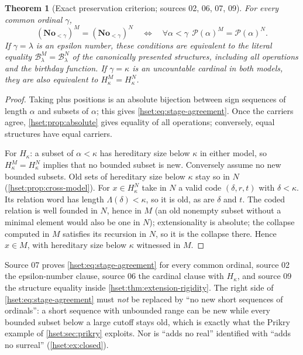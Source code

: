 \documentclass[11pt,letterpaper]{article}
\newtheorem{theorem}{Theorem}[section]
\theoremstyle{definition}
\theoremstyle{remark}
\newcommand{\No}{\mathbf{No}}
\newcommand{\B}{\mathcal B}
\newcommand{\Pow}{\mathcal P}
\begin{document}
\begin{theorem}[Exact preservation criterion; sources 02, 06, 07, 09]
\label{hset:thm:preservation}
For every common ordinal $\gamma$,
\begin{equation}
 (\No_{<\gamma})^M=(\No_{<\gamma})^N
 \quad\Longleftrightarrow\quad
 \forall\alpha<\gamma\ \ \Pow(\alpha)^M=\Pow(\alpha)^N.
 \label{hset:eq:stage-agreement}
\end{equation}
If $\gamma=\lambda$ is an epsilon number, these conditions are equivalent to the
literal equality $\B_\lambda^M=\B_\lambda^N$ of the canonically presented
structures, including all operations and the birthday function. If
$\gamma=\kappa$ is an uncountable cardinal in both models, they are also
equivalent to $H_\kappa^M=H_\kappa^N$.
\end{theorem}
\begin{proof}
Taking plus positions is an absolute bijection between sign sequences of
length $\alpha$ and subsets of $\alpha$; this gives \eqref{hset:eq:stage-agreement}.
Once the carriers agree, \cref{hset:prop:absolute} gives equality of all
operations; conversely, equal structures have equal carriers.

For $H_\kappa$: a subset of $\alpha<\kappa$ has hereditary size below $\kappa$ in
either model, so $H^M_\kappa=H^N_\kappa$ implies that no bounded subset is new.
Conversely assume no new bounded subsets. Old sets of hereditary size below
$\kappa$ stay so in $N$ (\cref{hset:prop:cross-model}). For $x\in H_\kappa^N$ take in
$N$ a valid code $(\delta,r,t)$ with $\delta<\kappa$. Its relation word has
length $\Lambda(\delta)<\kappa$, so it is old, as are $\delta$ and $t$. The coded
relation is well founded in $N$, hence in $M$ (an old nonempty subset without a
minimal element would also be one in $N$); extensionality is absolute; the
collapse computed in $M$ satisfies its recursion in $N$, so it is the collapse
there. Hence $x\in M$, with hereditary size below $\kappa$ witnessed in $M$.
\end{proof}

Source 07 proves \eqref{hset:eq:stage-agreement} for every common ordinal,
source 02 the epsilon-number clause, source 06 the cardinal clause with
$H_\kappa$, and source 09 the structure equality inside
\cref{hset:thm:extension-rigidity}. The right side of
\eqref{hset:eq:stage-agreement} must \emph{not} be replaced by ``no new short
sequences of ordinals'': a short sequence with unbounded range can be new while
every bounded subset below a large cutoff stays old, which is exactly what the
Prikry example of \cref{hset:sec:prikry} exploits. Nor is ``adds no real''
identified with ``adds no surreal'' (\cref{hset:ex:closed}).
\end{document}
